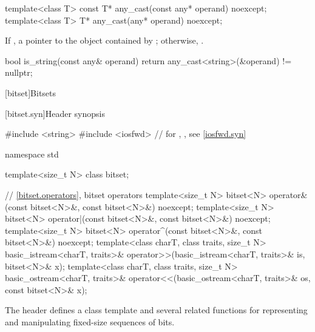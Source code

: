 %
\begin{itemdecl}
template<class T>
  const T* any_cast(const any* operand) noexcept;
template<class T>
  T* any_cast(any* operand) noexcept;
\end{itemdecl}

\begin{itemdescr}
\pnum
\returns
If ,
a pointer to the object contained by ;
otherwise, .

\pnum
\begin{example}
\begin{codeblock}
bool is_string(const any& operand) {
  return any_cast<string>(&operand) != nullptr;
}
\end{codeblock}
\end{example}
\end{itemdescr}

[bitset]{Bitsets}
%

[bitset.syn]{Header  synopsis}%

%

\begin{codeblock}
#include <string>
#include <iosfwd>   // for , , see \ref{iosfwd.syn}

namespace std {
  template<size_t N> class bitset;

  // \ref{bitset.operators}, bitset operators
  template<size_t N>
    bitset<N> operator&(const bitset<N>&, const bitset<N>&) noexcept;
  template<size_t N>
    bitset<N> operator|(const bitset<N>&, const bitset<N>&) noexcept;
  template<size_t N>
    bitset<N> operator^(const bitset<N>&, const bitset<N>&) noexcept;
  template<class charT, class traits, size_t N>
    basic_istream<charT, traits>&
      operator>>(basic_istream<charT, traits>& is, bitset<N>& x);
  template<class charT, class traits, size_t N>
    basic_ostream<charT, traits>&
      operator<<(basic_ostream<charT, traits>& os, const bitset<N>& x);
}
\end{codeblock}

\pnum
The header
defines a
class template
and several related functions for representing
and manipulating fixed-size sequences of bits.

